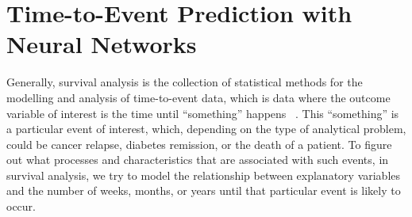 \chapter{Time-to-Event Prediction with Neural Networks}
\label{survival-analysis}



Generally, 
survival analysis is the collection of statistical methods
for the modelling and analysis of time-to-event data,
which is data where the outcome variable of interest 
is the time until \enquote{something} happens~%
\autocite{kleinbaumSurvival2011}.
This \enquote{something} is a particular event of interest,
which, depending on the type of analytical problem, 
could be cancer relapse, 
diabetes remission,
or the death of a patient.
To figure out what processes and characteristics 
that are associated with such events, 
in survival analysis, we try to model the relationship between
explanatory variables and the number of weeks, months, or years 
until that particular event is likely to occur. 



